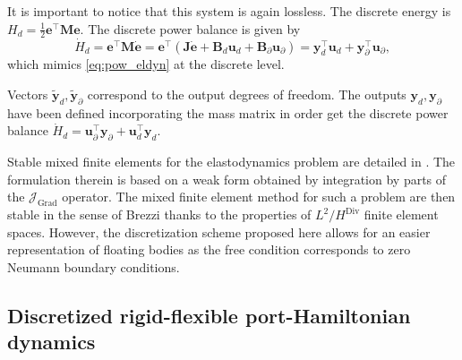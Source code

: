 \documentclass{svjour3}                     %
\DeclareMathOperator*{\Grad}{Grad}
\DeclareMathOperator*{\Div}{Div}
\begin{document}
It is important to notice that this system is again lossless. The discrete energy is $H_d = \frac{1}{2} \mathbf{e}^\top \mathbf{M} \mathbf{e}$.
The discrete power balance is given by
\begin{equation*}
\dot{H}_d = \mathbf{e}^\top \mathbf{M} \dot{\mathbf{e}} = \mathbf{e}^\top ( \mathbf{J} \dot{\mathbf{e}} + \mathbf{B}_d \mathbf{u}_d + \mathbf{B}_\partial \mathbf{u}_\partial) = \mathbf{y}_d^\top \mathbf{u}_d + \mathbf{y}_\partial^\top \mathbf{u}_\partial,
\end{equation*}
which mimics \eqref{eq:pow_eldyn} at the discrete level.
\begin{remark}
	Vectors $\widetilde{\mathbf{y}}_d, \widetilde{\mathbf{y}}_\partial$ correspond to the output degrees of freedom. The outputs $\mathbf{y}_d, \mathbf{y}_\partial$ have been defined incorporating the mass matrix in order get the discrete power balance $\dot{H}_d = \mathbf{u}_\partial^\top \mathbf{y}_\partial + \mathbf{u}_d^\top \mathbf{y}_d$.
\end{remark}
\begin{remark}
	Stable mixed finite elements for the elastodynamics problem are detailed in \cite{ArnoldElasDyn}.  The formulation therein is based on a weak form obtained by integration by parts of the $\bm{\mathcal{J}}_{\Grad}$ operator. The mixed finite element method for such a problem are then stable in the sense of Brezzi thanks to the properties of $L^2 / H^{\Div}$ finite element spaces. However, the discretization scheme proposed here allows for an easier representation of floating bodies as the free condition corresponds to zero Neumann boundary conditions.
\end{remark}

\subsection{Discretized rigid-flexible port-Hamiltonian dynamics}
\end{document}
